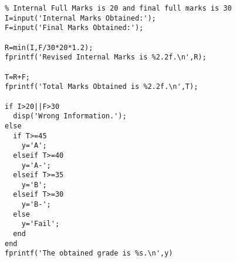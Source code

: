 \begin{verbatim}
% Internal Full Marks is 20 and final full marks is 30
I=input('Internal Marks Obtained:');
F=input('Final Marks Obtained:');

R=min(I,F/30*20*1.2);
fprintf('Revised Internal Marks is %2.2f.\n',R);

T=R+F;
fprintf('Total Marks Obtained is %2.2f.\n',T);

if I>20||F>30
  disp('Wrong Information.');
else
  if T>=45
    y='A';
  elseif T>=40
    y='A-';
  elseif T>=35
    y='B';
  elseif T>=30
    y='B-';
  else
    y='Fail';
  end
end
fprintf('The obtained grade is %s.\n',y)

\end{verbatim}
